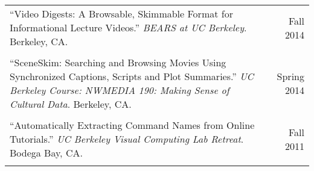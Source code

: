 \begin{longtable}{Xr}
	``Video Digests: A Browsable, Skimmable Format for Informational Lecture Videos.'' \textit{BEARS at UC Berkeley}. Berkeley, CA. & Fall 2014 \\
	\\

	``SceneSkim: Searching and Browsing Movies Using Synchronized Captions, Scripts and Plot Summaries.'' \textit{UC Berkeley Course: NWMEDIA 190: Making Sense of Cultural Data}. Berkeley, CA. & Spring 2014 \\
	\\

	``Automatically Extracting Command Names from Online Tutorials.'' \textit{UC Berkeley Visual Computing Lab Retreat}. Bodega Bay, CA. & Fall 2011 \\
	\\

\end{longtable}